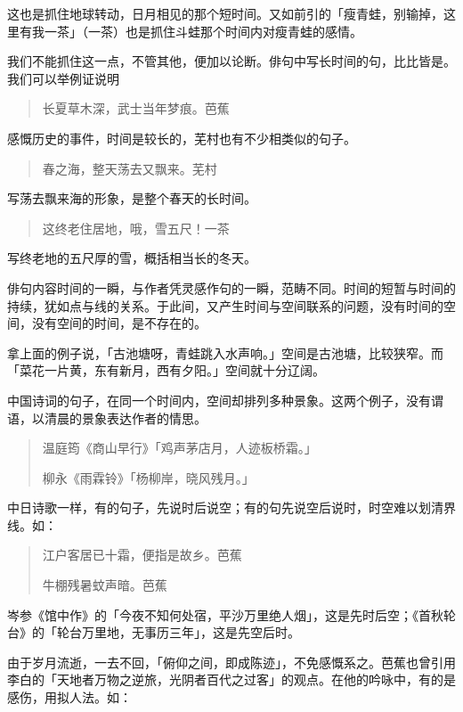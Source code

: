 {    这也是抓住地球转动，日月相见的那个短时间。又如前引的「瘦青蛙，别输掉，这里有我一茶」（一茶）也是抓住斗蛙那个时间内对瘦青蛙的感情。

    我们不能抓住这一点，不管其他，便加以论断。俳句中写长时间的句，比比皆是。我们可以举例证说明

    \begin{quote}
        长夏草木深，武士当年梦痕。\hfill 芭蕉
    \end{quote}

    感慨历史的事件，时间是较长的，芜村也有不少相类似的句子。

    \begin{quote}
        春之海，整天荡去又飘来。\hfill 芜村
    \end{quote}

    写荡去飘来海的形象，是整个春天的长时间。

    \begin{quote}
        这终老住居地，哦，雪五尺！\hfill 一茶
    \end{quote}

    写终老地的五尺厚的雪，概括相当长的冬天。

    俳句内容时间的一瞬，与作者凭灵感作句的一瞬，范畴不同。时间的短暂与时间的持续，犹如点与线的关系。于此间，又产生时间与空间联系的问题，没有时间的空间，没有空间的时间，是不存在的。

    拿上面的例子说，「古池塘呀，青蛙跳入水声响。」空间是古池塘，比较狭窄。而「菜花一片黄，东有新月，西有夕阳。」空间就十分辽阔。

    中国诗词的句子，在同一个时间内，空间却排列多种景象。这两个例子，没有谓语，以清晨的景象表达作者的情思。
    \begin{quote}
        温庭筠《商山早行》「鸡声茅店月，人迹板桥霜。」

        柳永《雨霖铃》「杨柳岸，晓风残月。」
    \end{quote}

    中日诗歌一样，有的句子，先说时后说空；有的句先说空后说时，时空难以划清界线。如：

    \begin{quote}
        江户客居已十霜，便指是故乡。\hfill 芭蕉

        牛棚残暑蚊声暗。\hfill 芭蕉
    \end{quote}

    岑参《馆中作》的「今夜不知何处宿，平沙万里绝人烟」，这是先时后空；《首秋轮台》的「轮台万里地，无事历三年」，这是先空后时。

    由于岁月流逝，一去不回，「俯仰之间，即成陈迹」，不免感慨系之。芭蕉也曾引用李白的「天地者万物之逆旅，光阴者百代之过客」的观点。在他的吟咏中，有的是感伤，用拟人法。如：

}

